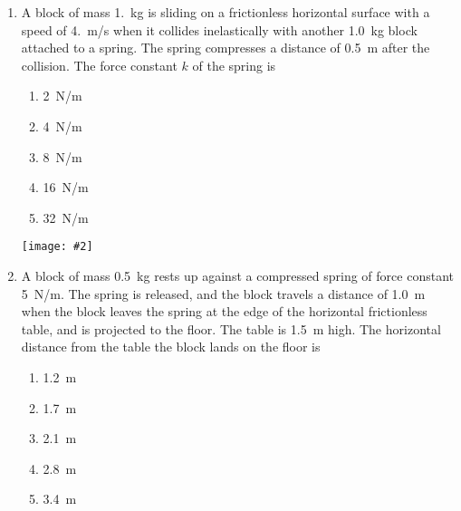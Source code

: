 \documentclass[12pt]{article}
\newcommand{\pic}[2]{\texttt{[image: \#2]}}
\begin{document}
\begin{enumerate}[leftmargin=50pt,label=\underline{\hspace{0.4in}} \arabic*.]
  \vspace{-.45in}\begin{center}
  \end{center}
  
\item\vspace{-.2in} A block of mass \SI{1.}{\kg} is sliding on a frictionless
  horizontal
  surface with a speed of \SI{4.}{m/s} when it collides inelastically with
  another \SI{1.0}{kg} block attached to a spring. The spring compresses a
  distance of \SI{.5}{m} after the collision. The force constant $k$ of the
  spring is
  \begin{enumerate}[noitemsep,topsep=0pt]
  \item\SI{2}{N/m}
  \item\SI{4}{N/m}
  \item\SI{8}{N/m}
  \item\SI{16}{N/m}
  \item\SI{32}{N/m}
  \end{enumerate}

  \begin{center}
    \pic{0.45}{projectile.png}
  \end{center}
  
\item A block of mass \SI{0.5}{kg} rests up against a compressed spring of force
  constant \SI{5}{N/m}. The spring is released, and the block travels a distance
  of \SI{1.0}{m} when the block leaves the spring at the edge of the horizontal
  frictionless table, and is projected to the floor. The table is \SI{1.5}{m}
  high. The horizontal distance from the table the block lands on the floor is
  \begin{enumerate}[noitemsep,topsep=0pt]
  \item\SI{1.2}{\metre}
  \item\SI{1.7}{\metre}
  \item\SI{2.1}{\metre}
  \item\SI{2.8}{\metre}
  \item\SI{3.4}{\metre}
  \end{enumerate}
\end{enumerate}
\end{document}

